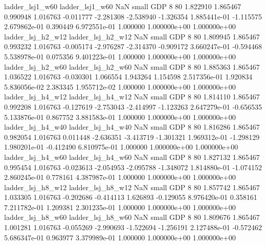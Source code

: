          ladder_lsj1_w60          ladder_lsj1_w60                   NaN      small      GDP                 8 80 1.822910       1.865467 0.990948       1.016763   -0.011777     -2.281308     -2.538940    -1.326354   1.885441e-01 -1.115575 2.679862e-01     0.390449   6.972551e-01            1.000000    1.000000e+00        1.000000e+00
       ladder_lsj_h2_w12        ladder_lsj_h2_w12                   NaN      small      GDP                 8 80 1.809945       1.865467 0.993232       1.016763   -0.005174     -2.976287     -2.314370    -0.909172   3.660247e-01 -0.594468 5.538978e-01     0.075356   9.401223e-01            1.000000    1.000000e+00        1.000000e+00
       ladder_lsj_h2_w60        ladder_lsj_h2_w60                   NaN      small      GDP                 8 80 1.885363       1.865467 1.036522       1.016763   -0.030301      1.066554      1.943264     1.154598   2.517356e-01  1.920834 5.836056e-02     2.383345   1.955712e-02            1.000000    1.000000e+00        1.000000e+00
       ladder_lsj_h4_w12        ladder_lsj_h4_w12                   NaN      small      GDP                 8 80 1.814110       1.865467 0.992208       1.016763   -0.127619     -2.753043     -2.414997    -1.123263   2.647279e-01 -0.656535 5.133876e-01     0.867752   3.881583e-01            1.000000    1.000000e+00        1.000000e+00
       ladder_lsj_h4_w40        ladder_lsj_h4_w40                   NaN      small      GDP                 8 80 1.816286       1.865467 0.982054       1.016763    0.011448     -2.636351     -3.413719    -1.301321   1.969312e-01 -1.298129 1.980201e-01    -0.412490   6.810975e-01            1.000000    1.000000e+00        1.000000e+00
       ladder_lsj_h4_w60        ladder_lsj_h4_w60                   NaN      small      GDP                 8 80 1.827132       1.865467 0.995454       1.016763   -0.023613     -2.054953     -2.095788    -1.348072   1.814880e-01 -1.074152 2.860245e-01     0.778161   4.387987e-01            1.000000    1.000000e+00        1.000000e+00
       ladder_lsj_h8_w12        ladder_lsj_h8_w12                   NaN      small      GDP                 8 80 1.857742       1.865467 1.033305       1.016763   -0.202686     -0.414113      1.626893    -0.129055   8.976420e-01  0.358161 7.211782e-01     1.209381   2.301235e-01            1.000000    1.000000e+00        1.000000e+00
       ladder_lsj_h8_w60        ladder_lsj_h8_w60                   NaN      small      GDP                 8 80 1.809676       1.865467 1.001281       1.016763   -0.055269     -2.990693     -1.522694    -1.256191   2.127488e-01 -0.572462 5.686347e-01     0.963977   3.379989e-01            1.000000    1.000000e+00        1.000000e+00
